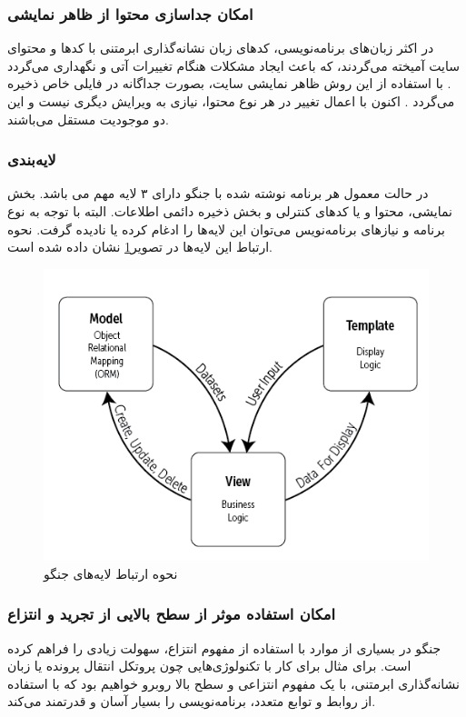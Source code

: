 {\subsubsection{امکان جداسازی محتوا از ظاهر نمایشی}
در اکثر زبان‌های برنامه‌نویسی، کدهای زبان نشانه‌گذاری ابرمتنی با کدها و محتوای سایت آمیخته می‌گردند، که باعث ایجاد مشکلات هنگام تغییرات آتی و نگهداری می‌گردد . با استفاده از این روش ظاهر نمایشی سایت، بصورت جداگانه در فایلی خاص ذخیره می‌گردد . اکنون با اعمال تغییر در هر نوع محتوا، نیازی به ویرایش دیگری نیست و این دو موجودیت مستقل می‌باشند.

\subsubsection{لایه‌بندی}
در حالت معمول هر برنامه نوشته شده با جنگو دارای ۳ لایه مهم می باشد. بخش نمایشی، محتوا و یا کدهای کنترلی و بخش ذخیره دائمی اطلاعات. البته با توجه به نوع برنامه و نیاز‌های برنامه‌نویس می‌توان این لایه‌ها را ادغام کرده یا نادیده گرفت. نحوه ارتباط این لایه‌ها در تصویر\ref{mtv} نشان داده شده است.
 
\begin{figure}[t!]
    \centering
    \includegraphics[scale=0.75]{figures/mtv.png}
    \caption{نحوه ارتباط لایه‌های جنگو}
    \label{mtv}
\end{figure}


\subsubsection{امکان استفاده موثر از سطح بالایی از تجرید و انتزاع}
جنگو در بسیاری از موارد با استفاده از مفهوم انتزاع، سهولت زیادی را فراهم کرده است. برای مثال برای کار با تکنولوژی‌هایی چون پروتکل انتقال پرونده یا زبان نشانه‌گذاری ابرمتنی، با یک مفهوم انتزاعی و سطح بالا روبرو خواهیم بود که با استفاده از روابط و توابع متعدد، برنامه‌نویسی را بسیار آسان و قدرتمند می‌کند.
 
}
